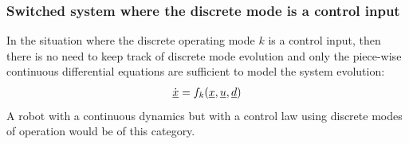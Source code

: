 \subsubsection{Switched system where the discrete mode is a control input}

In the situation where the discrete operating mode $k$ is a control input, then there is no need to keep track of discrete mode evolution and only the piece-wise continuous differential equations are sufficient to model the system evolution:
%
\begin{align}
\dot{\underline{x}} = f_k( \underline{x} , \underline{u} , \underline{d} ) 
\end{align}
%
A robot with a continuous dynamics but with a control law using discrete modes of operation would be of this category. 









